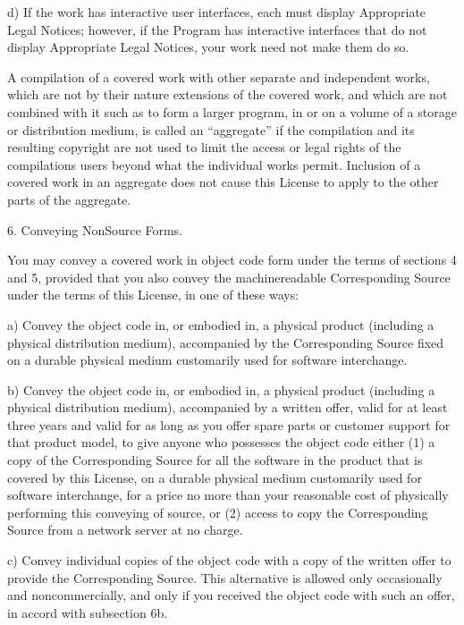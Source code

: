 \documentclass[letterpaper,10pt,english]{sphinxmanual}
\begin{document}
\begin{sphinxVerbatim}[commandchars=\\\{\}]
   d) If the work has interactive user interfaces, each must display
      Appropriate Legal Notices; however, if the Program has interactive
      interfaces that do not display Appropriate Legal Notices, your work need
      not make them do so.

   A compilation of a covered work with other separate and independent works,
   which are not by their nature extensions of the covered work, and which are
   not combined with it such as to form a larger program, in or on a volume of
   a storage or distribution medium, is called an “aggregate” if the
   compilation and its resulting copyright are not used to limit the access or
   legal rights of the compilation\PYGZsq{}s users beyond what the individual works
   permit. Inclusion of a covered work in an aggregate does not cause this
   License to apply to the other parts of the aggregate.

 6. Conveying Non\PYGZhy{}Source Forms.

   You may convey a covered work in object code form under the terms of
   sections 4 and 5, provided that you also convey the machine\PYGZhy{}readable
   Corresponding Source under the terms of this License, in one of these ways:

   a) Convey the object code in, or embodied in, a physical product (including
      a physical distribution medium), accompanied by the Corresponding Source
      fixed on a durable physical medium customarily used for software
      interchange.

   b) Convey the object code in, or embodied in, a physical product (including
      a physical distribution medium), accompanied by a written offer, valid
      for at least three years and valid for as long as you offer spare parts
      or customer support for that product model, to give anyone who possesses
      the object code either (1) a copy of the Corresponding Source for all the
      software in the product that is covered by this License, on a durable
      physical medium customarily used for software interchange, for a price no
      more than your reasonable cost of physically performing this conveying of
      source, or (2) access to copy the Corresponding Source from a network
      server at no charge.

   c) Convey individual copies of the object code with a copy of the written
      offer to provide the Corresponding Source. This alternative is allowed
      only occasionally and noncommercially, and only if you received the
      object code with such an offer, in accord with subsection 6b.


\end{sphinxVerbatim}
\end{document}
